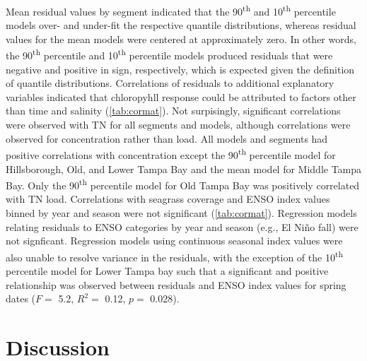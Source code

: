 \documentclass[letterpaper,12pt,oneside]{article}\usepackage[]{graphicx}\usepackage[]{color}
\newcommand{\nine}{90\textsuperscript{th} percentile }
\newcommand{\ten}{10\textsuperscript{th} percentile }
\begin{document}
Mean residual values by segment indicated that the 90\textsuperscript{th} and \ten models over- and under-fit the respective quantile distributions, whereas residual values for the mean models were centered at approximately zero.  In other words, the \nine and \ten models produced residuals that were negative and positive in sign, respectively, which is expected given the definition of quantile distributions.  Correlations of residuals to additional explanatory variables indicated that chloropyhll response could be attributed to factors other than time and salinity (\cref{tab:cormat}). Not surpisingly, significant correlations were observed with \ac{TN} for all segments and models, although correlations were observed for concentration rather than load.  All models and segments had positive correlations with concentration except the \nine model for Hillsborough, Old, and Lower Tampa Bay and the mean model for Middle Tampa Bay.  Only the \nine model for Old Tampa Bay was positively correlated with \ac{TN} load.  Correlations with seagrass coverage and \ac{ENSO} index values binned by year and season were not significant (\cref{tab:cormat}).  Regression models relating residuals to \ac{ENSO} categories by year and season (e.g., El Ni\~{n}o fall) were not signficant.  Regression models using continuous seasonal index values were also unable to resolve variance in the residuals, with the exception of the \ten model for Lower Tampa bay such that a significant and positive relationship was observed between residuals and \ac{ENSO} index values for spring dates ($F=$ 5.2, $R^2 =$ 0.12, $p=$ 0.028).  

\section{Discussion}
\end{document}
